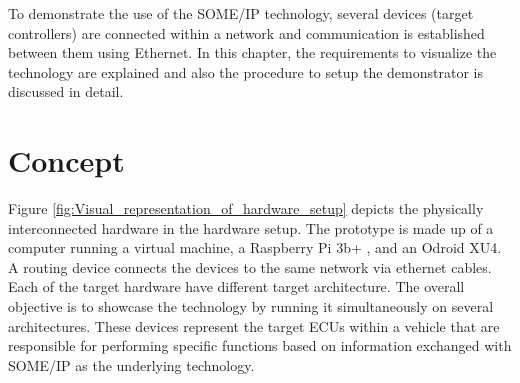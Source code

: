 To demonstrate the use of the SOME/IP technology, several devices (target controllers) are connected within a network and communication is established between them using Ethernet. In this chapter, the requirements to visualize the technology are explained and also the procedure to setup the demonstrator is discussed in detail. 

\section{Concept}
Figure \ref{fig:Visual_representation_of_hardware_setup} depicts the physically interconnected hardware in the hardware setup. The prototype is made up of a computer running a virtual machine\cite{b_hyperv}, a Raspberry Pi 3b+ \cite{b_raspi3b}, and an Odroid XU4\cite{b_odroidxu4}. A routing device connects the devices to the same network via ethernet cables. Each of the target hardware have different target architecture. The overall objective is to showcase the technology by running it simultaneously on several architectures. These devices represent the target ECUs within a vehicle that are responsible for performing specific functions based on information exchanged with SOME/IP as the underlying technology.

